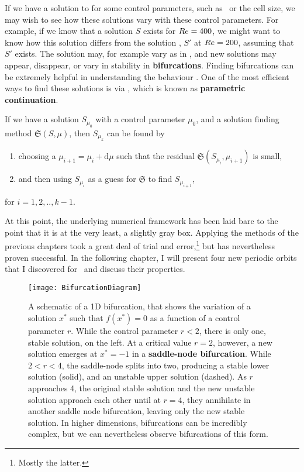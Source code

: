  If we have a solution to  for some control parameters, such as \ReN\ or the cell size, we may wish to see how these solutions vary with these control parameters. For example, if we know that a solution $S$  exists for $Re = 400$, we might want to know how this solution differs from the solution , $S'$ at $Re = 200$, assuming that $S'$ exists. The solution may, for example vary as in , and new solutions may appear, disappear, or vary in stability in {\bf bifurcations}. Finding bifurcations can be extremely helpful in understanding the behaviour .  One of the most efficient ways to find these solutions is via , which is known as {\bf parametric continuation}.
 \begin{algorithm}\label{alg:parCont}
 If we have a solution $S_{\mu_0}$ with a control parameter $\mu_0$,  and a solution finding method $\mathfrak{S}(S,\mu)$, then $S_{\mu_k}$ can be found by
 \begin{enumerate}
 \item choosing a $\mu_{i+1} = \mu_{i} + \mathrm{d}\mu$ such that the residual $\mathfrak{S}(S_{\mu_{i}},\mu_{i+1})$ is small,
 \item and then using $S_{\mu_i}$ as a guess for $\mathfrak{S}$ to find $S_{\mu_{i+1}}$,
 \end{enumerate}
 for $i = 1,2,..,k-1$.
 \end{algorithm}
\par
At this point, the underlying numerical framework has been laid bare to the point that it is at the very least, a slightly gray box. Applying the methods of the previous chapters took a great deal of trial and error,\footnote{Mostly the latter.} but has nevertheless proven successful. In the following chapter, I will present four new periodic orbits that I discovered for \pCf\, and discuss their properties.   
 \begin{figure}[h]
 \centerline{\texttt{[image: BifurcationDiagram]}}
 \caption{A schematic of a 1D bifurcation, that shows the variation of a solution $x^*$ such that $f(x^*) = 0$ as a function of a control parameter $r$. While the control parameter $r < 2$, there is only one, stable solution, on the left. At a critical value $r = 2$, however, a new solution emerges at $x^* = -1$ in a {\bf saddle-node bifurcation}. While $2 < r < 4$, the saddle-node splits into two, producing a stable lower solution (solid), and an unstable upper solution (dashed). As $r$ approaches 4, the original stable solution and the new unstable solution approach each other until at $r= 4$, they annihilate in another saddle node bifurcation, leaving only the new stable solution. In higher dimensions, bifurcations can be incredibly complex, but we can nevertheless observe bifurcations of this form. }\label{fig:bifurcations}
 \end{figure}
 
 